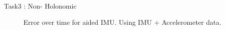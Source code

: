 \documentclass[10pt]{beamer}
\theoremstyle{definition}
\begin{document}
\begin{frame}{Task3 : Non- Holonomic}
\begin{figure}

    \caption{Error over time for aided IMU. Using IMU + Accelerometer data.}
    
\end{figure}
\end{frame}
\end{document}
